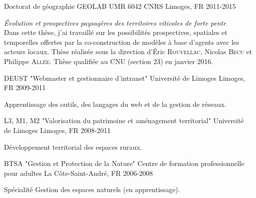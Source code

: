 

\begin{cventries}

  \cventry
    {Doctorat de géographie} %
    {GEOLAB UMR 6042 CNRS} %
    {Limoges, FR} %
    {2011-2015} %
    {
      \begin{cvitems} %
        \emph{\'Evolution et prospectives paysagères des territoires viticoles de forte pente} \\Dans cette thèse, j'ai travaillé sur les possibilités prospectives, spatiales et temporelles offertes par la co-construction de modèles à base d'agents avec les acteurs locaux. Thèse réalisée sous la direction d'\'Eric \textsc{Rouvellac}, Nicolas \textsc{Becu} et Philippe \textsc{Allée}. Thèse qualifiée au CNU (section 23) en janvier 2016.
      \end{cvitems}
    }

\cventry
  {DEUST {\normalfont "Webmaster et gestionnaire d’intranet"}} %
  {Université de Limoges} %
  {Limoges, FR} %
  {2009-2011} %
  {
    \begin{cvitems} %
      Apprentissage des outils, des langages du web et de la gestion de réseaux.
    \end{cvitems}
  }

\cventry
  {L3, M1, M2 "Valorisation du patrimoine et aménagement territorial"} %
  {Université de Limoges} %
  {Limoges, FR} %
  {2008-2011} %
  {
    \begin{cvitems} %
      Développement territorial des espaces ruraux.
    \end{cvitems}
  }

\cventry
  {BTSA "Gestion et Protection de la Nature"} %
  {Centre de formation professionnelle pour adultes} %
  {La Côte-Saint-André, FR} %
  {2006-2008} %
  {
    \begin{cvitems} %
      Spécialité Gestion des espaces naturels (en apprentissage).
    \end{cvitems}
  }


\end{cventries}
